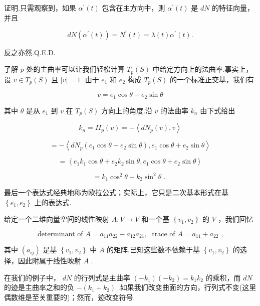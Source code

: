 证明.只需观察到，如果 \({\alpha }^{\prime }\left( t\right)\) 包含在主方向中，则 \({\alpha }^{\prime }\left( t\right)\) 是 \({dN}\) 的特征向量，并且

\[
{dN}\left( {{\alpha }^{\prime }\left( t\right) }\right)  = {N}^{\prime }\left( t\right)  = \lambda \left( t\right) {\alpha }^{\prime }\left( t\right) .
\]

反之亦然.Q.E.D.

了解 \(p\) 处的主曲率可以让我们轻松计算 \({T}_{p}\left( S\right)\) 中给定方向上的法曲率.事实上，设 \(v \in  {T}_{p}\left( S\right)\) 且 \(\left| v\right|  = 1\) .由于 \({e}_{1}\) 和 \({e}_{2}\) 构成 \({T}_{p}\left( S\right)\) 的一个标准正交基，我们有

\[
v = {e}_{1}\cos \theta  + {e}_{2}\sin \theta
\]

其中 \(\theta\) 是从 \({e}_{1}\) 到 \(v\) 在 \({T}_{p}\left( S\right)\) 方向上的角度.沿 \(v\) 的法曲率 \({k}_{n}\) 由下式给出

\[
{k}_{n} = I{I}_{p}\left( v\right)  =  - \left\langle  {d{N}_{p}\left( v\right) ,v}\right\rangle
\]

\[
=  - \left\langle  {d{N}_{p}\left( {{e}_{1}\cos \theta  + {e}_{2}\sin \theta }\right) ,{e}_{1}\cos \theta  + {e}_{2}\sin \theta }\right\rangle
\]

\[
= \left\langle  {{e}_{1}{k}_{1}\cos \theta  + {e}_{2}{k}_{2}\sin \theta ,{e}_{1}\cos \theta  + {e}_{2}\sin \theta }\right\rangle
\]

\[
= {k}_{1}{\cos }^{2}\theta  + {k}_{2}{\sin }^{2}\theta \text{ . }
\]

最后一个表达式经典地称为欧拉公式；实际上，它只是二次基本形式在基 \(\left\{  {{e}_{1},{e}_{2}}\right\}\) 上的表达式.

给定一个二维向量空间的线性映射 \(A : V \rightarrow  V\) 和一个基 \(\left\{  {{v}_{1},{v}_{2}}\right\}\) 的 \(V\) ，我们回忆

\[
\text{ determinant of }A = {a}_{11}{a}_{22} - {a}_{12}{a}_{21},\;\text{ trace of }A = {a}_{11} + {a}_{22}\text{ , }
\]

其中 \(\left( {a}_{ij}\right)\) 是基 \(\left\{  {{v}_{1},{v}_{2}}\right\}\) 中 \(A\) 的矩阵.已知这些数不依赖于基 \(\left\{  {{v}_{1},{v}_{2}}\right\}\) 的选择，因此附属于线性映射 \(A\) .

在我们的例子中， \({dN}\) 的行列式是主曲率 \(\left( {-{k}_{1}}\right) \left( {-{k}_{2}}\right)  = {k}_{1}{k}_{2}\) 的乘积，而 \({dN}\) 的迹是主曲率之和的负 \(- \left( {{k}_{1} + {k}_{2}}\right)\) .如果我们改变曲面的方向，行列式不变(这里偶数维是至关重要的)；然而，迹改变符号.

